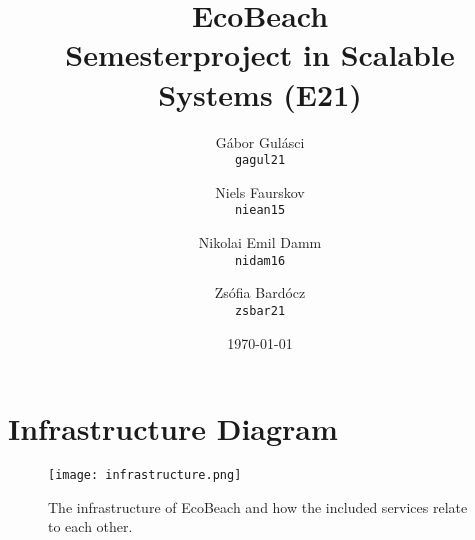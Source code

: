 \documentclass[12pt, oneside]{book}
\title{EcoBeach \\
    \large Semesterproject in Scalable Systems (E21)}
\author{
    Gábor Gulásci\\
    \texttt{gagul21}
    \and
    Niels Faurskov\\
    \texttt{niean15}
    \and
    Nikolai Emil Damm\\
    \texttt{nidam16}
    \and
    Zsófia Bardócz\\
    \texttt{zsbar21}    
}
\date{\today}
\begin{document}
\clearpage\maketitle
\thispagestyle{empty}
\frontmatter
% 

\tableofcontents

\mainmatter




\printbibliography[heading=bibintoc]
\printglossaries



\backmatter
\appendix
% 

\section{Infrastructure Diagram}

\begin{figure}[h!]
    \centering
    \texttt{[image: infrastructure.png]}
    \caption{The infrastructure of EcoBeach and how the included services relate to each other.}
    \label{fig:infrastructure}
\end{figure}
\end{document}
